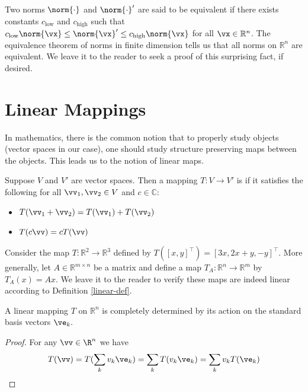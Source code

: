 Two norms $\norm{\cdot}$ and $\norm{\cdot}'$ are said to be equivalent if there exists constants $c_{\text{low}}$ and $c_{\text{high}}$ such that 
$c_{\text{low}} \norm{\vx} \leq \norm{\vx}' \leq c_{\text{high}} \norm{\vx}$
for all $\vx \in \mathbb R^n$. The equivalence theorem of norms in finite dimension tells us that all norms on $\mathbb R^n$ are equivalent. We leave it to the reader to seek a proof of this surprising fact, if desired.

\section{Linear Mappings} 

In mathematics, there is the common notion that to properly study objects (vector spaces in our case), one should study structure preserving maps between the objects. This leads us to the notion of linear maps.

\begin{definition}\label{linear-def}
Suppose $V$ and $V'$ are vector spaces. Then a mapping $T : V \rightarrow V'$ is  if it satisfies the following for all $\vv_1, \vv_2 \in V$ and $c \in \mathbb C$:
\begin{itemize}
\item $T(\vv_1 + \vv_2) = T(\vv_1) + T(\vv_2)$
\item $T(c\vv) = c T(\vv)$
\end{itemize}
\end{definition}

\begin{example}\label{lin-map-ex}
Consider the map $T : \mathbb R^2 \to \mathbb R^3$ defined by
$T([x,y]^\intercal)=[3x, 2x + y, -y]^\intercal$.
More generally, let $A\in\mathbb{R}^{m\times n}$ be a matrix and define a map $T_A:\mathbb{R}^n\to\mathbb{R}^m$ by $T_A(x)=Ax$. 
We leave it to the reader to verify these maps are indeed linear according to Definition \ref{linear-def}. 
\end{example}

\begin{proposition} 
A linear mapping $T$ on $\mathbb R^n$ is completely determined by its action on the standard basis vectors $\ve_k.$
\end{proposition}

\begin{proof} For any $\vv\in\R^n$ we have
$$
T(\vv) = 
T(\sum_{k } v_k \ve_k) = 
\sum_k T(v_k \ve_k) = 
\sum_k v_k T(\ve_k)\qedhere
$$
\end{proof}

